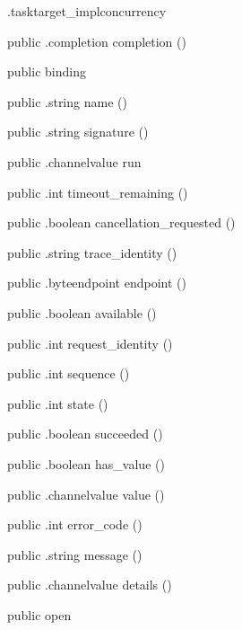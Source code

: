 \begin{CrexxClass}{.tasktarget\_impl}{concurrency}
\begin{Members}
    \Method
      {public}
      {.completion}
      {completion}
      {()}

    \Factory
      {public}
      {binding}
      {}

    \Method
      {public}
      {.string}
      {name}
      {()}

    \Method
      {public}
      {.string}
      {signature}
      {()}

    \Method
      {public}
      {.channelvalue}
      {run}
      {}

    \Method
      {public}
      {.int}
      {timeout\_remaining}
      {()}

    \Method
      {public}
      {.boolean}
      {cancellation\_requested}
      {()}

    \Method
      {public}
      {.string}
      {trace\_identity}
      {()}

    \Method
      {public}
      {.byteendpoint}
      {endpoint}
      {()}

    \Method
      {public}
      {.boolean}
      {available}
      {()}

    \Method
      {public}
      {.int}
      {request\_identity}
      {()}

    \Method
      {public}
      {.int}
      {sequence}
      {()}

    \Method
      {public}
      {.int}
      {state}
      {()}

    \Method
      {public}
      {.boolean}
      {succeeded}
      {()}

    \Method
      {public}
      {.boolean}
      {has\_value}
      {()}

    \Method
      {public}
      {.channelvalue}
      {value}
      {()}

    \Method
      {public}
      {.int}
      {error\_code}
      {()}

    \Method
      {public}
      {.string}
      {message}
      {()}

    \Method
      {public}
      {.channelvalue}
      {details}
      {()}

    \Factory
      {public}
      {open}
      {}


\end{Members}
\end{CrexxClass}
